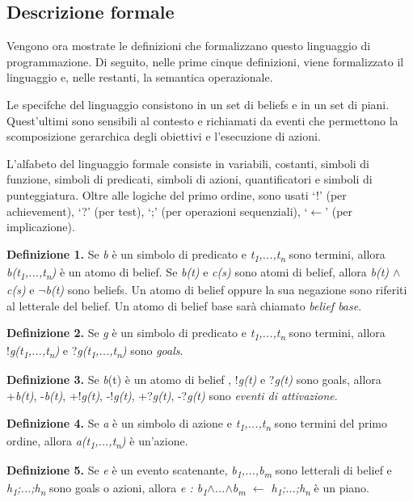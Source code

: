 \subsection{Descrizione formale}
Vengono ora mostrate le definizioni che formalizzano questo linguaggio di programmazione.
Di seguito, nelle prime cinque definizioni, viene formalizzato il linguaggio e, nelle restanti, la semantica operazionale.

\medskip
Le specifche del linguaggio consistono in un set di beliefs e in un set di piani. Quest'ultimi sono sensibili al contesto e richiamati da eventi che permettono la scomposizione gerarchica degli obiettivi e l'esecuzione di azioni.

L'alfabeto del linguaggio formale consiste in variabili, costanti, simboli di funzione, simboli di predicati, simboli di azioni, quantificatori e simboli di punteggiatura. Oltre alle logiche del primo ordine, sono usati `!' (per achievement), `?' (per test), `;' (per operazioni sequenziali), `$\leftarrow$' (per implicazione).

\smallskip
\textbf{Definizione 1.} Se \textit{b} \`e un simbolo di predicato e \textit{t\textsubscript{1},...,t\textsubscript{n}} sono termini, allora \textit{b(t\textsubscript{1},...,t\textsubscript{n})} \`e un atomo di belief. Se \textit{b(t)} e \textit{c(s)} sono atomi di belief, allora \textit{b(t) $\land$ c(s)} e \textit{$\neg$b(t)} sono beliefs. Un atomo di belief oppure la sua negazione sono riferiti al letterale del belief. Un atomo di belief base sar\`a chiamato \textit{belief base}.

\smallskip
\textbf{Definizione 2.} Se \textit{g} \`e un simbolo di predicato e \textit{t\textsubscript{1},...,t\textsubscript{n}} sono termini, allora !\textit{g(t\textsubscript{1},...,t\textsubscript{n})} e ?\textit{g(t\textsubscript{1},...,t\textsubscript{n})} sono \textit{goals}.

\smallskip
\textbf{Definizione 3.} Se \textit{b}(t) \`e un atomo di belief , !\textit{g(t)} e ?\textit{g(t)} sono goals, allora +\textit{b(t)}, -\textit{b(t)}, +!\textit{g(t)}, -!\textit{g(t)}, +?\textit{g(t)}, -?\textit{g(t)} sono \textit{eventi di attivazione}.

\smallskip
\textbf{Definizione 4.} Se \textit{a} \`e un simbolo di azione e \textit{t\textsubscript{1},...,t\textsubscript{n}} sono termini del primo ordine, allora \textit{a(t\textsubscript{1},...,t\textsubscript{n})} \`e un'azione.

\smallskip
\textbf{Definizione 5.} Se \textit{e} \`e un evento scatenante, \textit{b\textsubscript{1},...,b\textsubscript{m}} sono letterali di belief e \textit{h\textsubscript{1};...;h\textsubscript{n}} sono goals o azioni, allora \textit{e : b\textsubscript{1}$\land$...$\land$b\textsubscript{m} $\leftarrow$ h\textsubscript{1};...;h\textsubscript{n}} \`e un piano.

